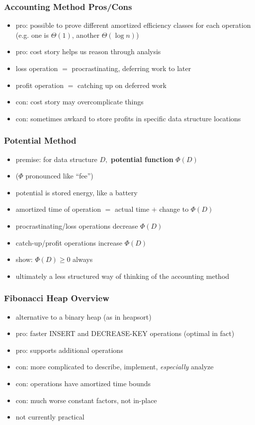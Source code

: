 \documentclass{beamer}
\begin{document}
\begin{frame} \frametitle{Accounting Method Pros/Cons}
  \begin{itemize}
    \item pro: possible to prove different amortized efficiency classes for
      each operation (e.g. one is $\Theta(1)$, another $\Theta(\log n)$)
    \item pro: cost story helps us reason through analysis
    \item loss operation $ = $ procrastinating, deferring work to later
    \item profit operation $ = $ catching up on deferred work
    \item con: cost story may overcomplicate things
    \item con: sometimes awkard to store profits in specific data structure
      locations
  \end{itemize}
\end{frame}

\begin{frame} \frametitle{Potential Method}
\begin{itemize}
  \item premise: for data structure $D,$ \textbf{potential function} $\Phi(D)$
  \item ($\Phi$ pronounced like ``fee'')
  \item potential is stored energy, like a battery
  \item amortized time of operation $=$ actual time $+$ change to $\Phi(D)$
  \item procrastinating/loss operations decrease $\Phi(D)$
  \item catch-up/profit operations increase $\Phi(D)$
  \item show: $\Phi(D) \geq 0$ always
  \item ultimately a less structured way of thinking of the accounting method
\end{itemize}
\end{frame}

\begin{frame} \frametitle{Fibonacci Heap Overview}
\begin{itemize}
  \item alternative to a binary heap (as in heapsort)
  \item pro: faster INSERT and DECREASE-KEY operations (optimal in fact)
  \item pro: supports additional operations
  \item con: more complicated to describe, implement, \emph{especially} analyze
  \item con: operations have amortized time bounds
  \item con: much worse constant factors, not in-place
  \item not currently practical
\end{itemize}
\end{frame}
\end{document}
